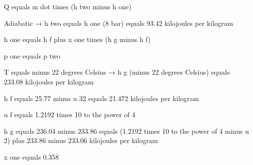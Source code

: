 Q equals m dot times (h two minus h one)  

Adiabatic → h two equals h one (8 bar) equals 93.42 kilojoules per kilogram  

h one equals h f plus x one times (h g minus h f)  

p one equals p two  

T equals minus 22 degrees Celsius → h g (minus 22 degrees Celsius) equals 233.08 kilojoules per kilogram  

h f equals 25.77 minus u 32 equals 21.472 kilojoules per kilogram  

u f equals 1.2192 times 10 to the power of 4  

h g equals 236.04 minus 233.86 equals (1.2192 times 10 to the power of 4 minus u 2) plus 233.86 minus 233.06 kilojoules per kilogram  

x one equals 0.358